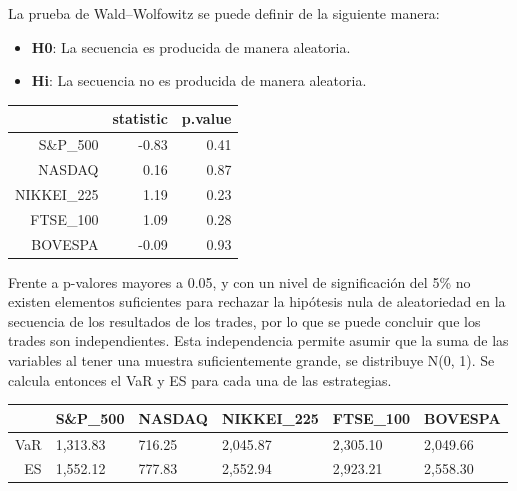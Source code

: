 \documentclass[a4paper,12pt]{Latex/Classes/PhDthesisPSnPDF}
\begin{document}
La prueba de Wald–Wolfowitz se puede definir de la siguiente manera:

\begin{itemize}
\item \textbf{H0}: La secuencia es producida de manera aleatoria.
\item \textbf{Hi}: La secuencia no es producida de manera aleatoria.
\end{itemize}

 
\begin{center}
\begin{table}[ht]
\centering
\begin{tabular}{rrr}
  \hline
 & statistic & p.value \\ 
  \hline
S\&P\_500 & -0.83 & 0.41 \\ 
  NASDAQ & 0.16 & 0.87 \\ 
  NIKKEI\_225 & 1.19 & 0.23 \\ 
  FTSE\_100 & 1.09 & 0.28 \\ 
  BOVESPA & -0.09 & 0.93 \\ 
   \hline
\end{tabular}
\end{table}\end{center}

Frente a p-valores mayores a 0.05, y con un nivel de significación del 5\% no existen elementos suficientes para rechazar la hipótesis nula de aleatoriedad en la secuencia de los resultados de los trades, por lo que se puede concluir que los trades son independientes. Esta independencia permite asumir que la suma de las variables al tener una muestra suficientemente grande, se distribuye N(0, 1). Se calcula entonces el VaR y ES para cada una de las estrategias.


\begin{center}
\begin{table}[ht]
\centering
\begin{tabular}{rlllll}
  \hline
 & S\&P\_500 & NASDAQ & NIKKEI\_225 & FTSE\_100 & BOVESPA \\ 
  \hline
VaR & 1,313.83 & 716.25 & 2,045.87 & 2,305.10 & 2,049.66 \\ 
  ES & 1,552.12 & 777.83 & 2,552.94 & 2,923.21 & 2,558.30 \\ 
   \hline
\end{tabular}
\end{table}\end{center}
  
\end{document}
